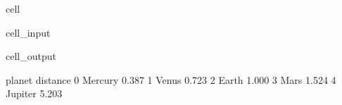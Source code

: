 \documentclass[letterpaper,10pt,english]{jupyterBook}
\begin{document}
\begin{sphinxuseclass}{cell}\begin{sphinxVerbatimInput}

\begin{sphinxuseclass}{cell_input}
\begin{sphinxVerbatim}[commandchars=\\\{\}]
\PYG{p}{[}\PYG{p}{]}  \PYG{p}{[}\PYG{p}{]} 
\end{sphinxVerbatim}

\end{sphinxuseclass}\end{sphinxVerbatimInput}
\begin{sphinxVerbatimOutput}

\begin{sphinxuseclass}{cell_output}
\begin{sphinxVerbatim}[commandchars=\\\{\}]
    planet  distance
0  Mercury     0.387
1    Venus     0.723
2    Earth     1.000
3     Mars     1.524
4  Jupiter     5.203
\end{sphinxVerbatim}

\end{sphinxuseclass}\end{sphinxVerbatimOutput}

\end{sphinxuseclass}
\end{document}
